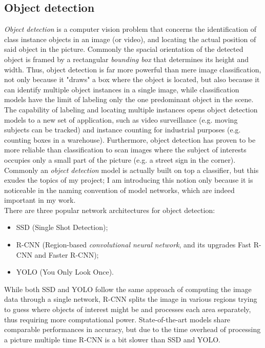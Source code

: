 	\subsection{Object detection}
	\emph{Object detection} is a computer vision problem that concerns the identification of class instance objects in an image (or video), and locating the actual position of said object in the picture. Commonly the spacial orientation of the detected object is framed by a rectangular \emph{bounding box} that determines its height and width. Thus, object detection is far more powerful than mere image classification, not only because it "draws" a box where the object is located, but also because it can identify multiple object instances in a single image, while classification models have the limit of labeling only the one predominant object in the scene. The capability of labeling and locating multiple instances opens object detection models to a new set of application, such as video surveillance (e.g. moving subjects can be tracked) and instance counting for industrial purposes (e.g. counting boxes in a warehouse). Furthermore, object detection has proven to be more reliable than classification to scan images where the subject of interests occupies only a small part of the picture (e.g. a street sign in the corner). \\
	Commonly an \emph{object detection} model is actually built on top a classifier, but this exudes the topics of my project; I am introducing this notion only because it is noticeable in the naming convention of model networks, which are indeed important in my work. \\
	There are three popular network architectures for object detection:
	\begin{itemize}
		\item SSD (Single Shot Detection);
		\item R-CNN (Region-based \emph{convolutional neural network}, and its upgrades Fast R-CNN and Faster R-CNN);
		\item YOLO (You Only Look Once).
	\end{itemize}
While both SSD and YOLO follow the same approach of computing the image data through a single network, R-CNN splits the image in various regions trying to guess where objects of interest might be and processes each area separately, thus requiring more computational power. State-of-the-art models share comparable performances in accuracy, but due to the time overhead of processing a picture multiple time R-CNN is a bit slower than SSD and YOLO.

